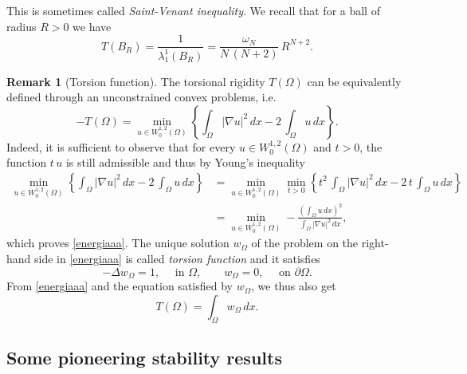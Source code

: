 \documentclass{amsart}
\theoremstyle{definition}
\newtheorem{remark}[lemma]{Remark}
\numberwithin{equation}{section}
\begin{document}
This is sometimes called {\it Saint-Venant inequality}. We recall that for a ball of radius $R>0$ we have
\begin{equation}
\label{torsopalla}
T(B_R)=\frac{1}{\lambda_1^1(B_R)}=\frac{\omega_N}{N\,(N+2)}\, R^{N+2}.
\end{equation}
\begin{remark}[Torsion function]
\label{oss:torsion}
The torsional rigidity $T(\Omega)$ can be equivalently defined through an unconstrained convex problems, i.e.
\begin{equation}
\label{energiaaa}
-T(\Omega)=\min_{u\in W^{1,2}_0(\Omega)} \left\{\int_\Omega |\nabla u|^2\,dx-2\,\int_\Omega u\,dx\right\}.
\end{equation}
Indeed, it is sufficient to observe that for every $u\in W^{1,2}_0(\Omega)$ and $t>0$, the function $t\,u$ is still admissible and thus by Young's inequality
\[
\begin{split}
\min_{u\in W^{1,2}_0(\Omega)} \left\{\int_\Omega |\nabla u|^2\,dx-2\,\int_\Omega u\,dx\right\}&=\min_{u\in W^{1,2}_0(\Omega)} \min_{t>0} \left\{t^2\,\int_\Omega |\nabla u|^2\,dx-2\,t\,\int_\Omega u\,dx\right\}\\
&=\min_{u\in W^{1,2}_0(\Omega)} -\frac{\displaystyle\left(\int_\Omega u\,dx\right)^2}{\displaystyle\int_\Omega |\nabla u|^2\,dx},
\end{split}
\]
which proves \eqref{energiaaa}.
The unique solution $w_\Omega$ of the problem on the right-hand side in \eqref{energiaaa} is called {\it torsion function} and it satisfies
\[
-\Delta w_\Omega=1,\quad \mbox{ in }\Omega,\qquad w_\Omega=0,\quad \mbox{ on }\partial\Omega.
\]
From \eqref{energiaaa} and the equation satisfied by $w_\Omega$, we thus also get
\[
T(\Omega)=\int_\Omega w_\Omega\,dx.
\]
\end{remark}

\subsection{Some pioneering stability results}
\label{sec:HNM}
\end{document}

